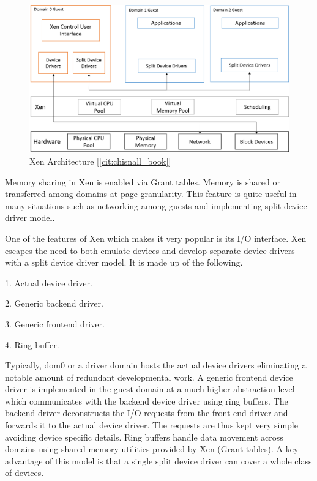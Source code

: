 \begin{figure}[H]
\centering
\includegraphics[scale=0.6]{figures/Xen_model.png}
\caption{Xen Architecture [\ref{cit:chisnall_book}]}
\label{fig:xen_model}
\end{figure}
Memory sharing in Xen is enabled via Grant tables. Memory is shared or transferred among domains at page granularity. This feature is quite useful in many situations such as networking among guests and implementing split device driver model.

One of the features of Xen which makes it very popular is its I/O interface. Xen escapes the need to both emulate devices and develop separate device drivers with a split device driver model. It is made up of the following.

1. Actual device driver.

2. Generic backend driver.

3. Generic frontend driver.

4. Ring buffer.

Typically, dom0 or a driver domain hosts the actual device drivers eliminating a notable amount of redundant developmental work. A generic frontend device driver is implemented in the guest domain at a much higher abstraction level which communicates with the backend device driver using ring buffers. The backend driver deconstructs the I/O requests from the front end driver and forwards it to the actual device driver. The requests are thus kept very simple avoiding device specific details. Ring buffers handle data movement across domains using shared memory utilities provided by Xen (Grant tables). A key advantage of this model is that a single split device driver can cover a whole class of devices.

